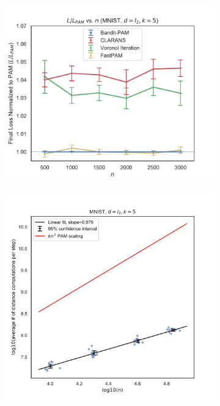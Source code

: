 \begin{figure}[ht]
\label{fig:losses}
    \begin{subfigure}{.35\textwidth}
        \centering
        \includegraphics[width=\linewidth]{figures/loss_plot.pdf} 
        \caption{}
    \end{subfigure}
    \begin{subfigure}{.3\textwidth}
      \centering
      \includegraphics[width=\linewidth]{figures/MNIST-L2-k5.pdf}  

\end{subfigure}
\end{figure}
